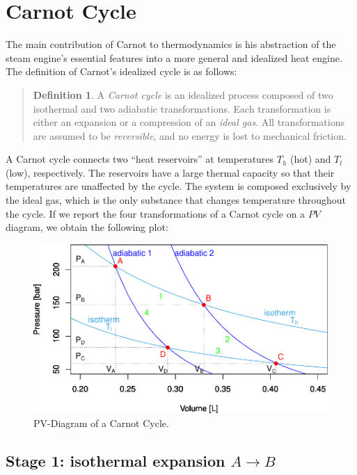 \documentclass[
  9pt,
]{extbook}
\theoremstyle{definition}
\newtheorem{definition}{Definition}[chapter]
\theoremstyle{definition}
\theoremstyle{definition}
\theoremstyle{definition}
\theoremstyle{remark}
\begin{document}
\section{Carnot Cycle}\label{carnotcyclesect}

The main contribution of Carnot to thermodynamics is his abstraction of the steam engine's essential features into a more general and idealized heat engine. The definition of Carnot's idealized cycle is as follows:

\begin{quote}
\begin{definition}
\protect\hypertarget{def:carnotcycle}{}\label{def:carnotcycle}A \emph{Carnot cycle} is an idealized process composed of two isothermal and two adiabatic transformations. Each transformation is either an expansion or a compression of an \emph{ideal gas}. All transformations are assumed to be \emph{reversible}, and no energy is lost to mechanical friction.
\end{definition}
\end{quote}

A Carnot cycle connects two ``heat reservoirs'' at temperatures \(T_h\) (hot) and \(T_l\) (low), respectively. The reservoirs have a large thermal capacity so that their temperatures are unaffected by the cycle. The system is composed exclusively by the ideal gas, which is the only substance that changes temperature throughout the cycle. If we report the four transformations of a Carnot cycle on a \(PV\) diagram, we obtain the following plot:

\begin{figure}

{\centering \includegraphics[width=0.7\linewidth]{pchem1_files/figure-latex/FigCarnotPV-1} 

}

\caption{PV-Diagram of a Carnot Cycle.}\label{fig:FigCarnotPV}
\end{figure}

\subsection{\texorpdfstring{Stage 1: isothermal expansion \(A \rightarrow B\)}{Stage 1: isothermal expansion A \textbackslash rightarrow B}}\label{CCstage1}
\end{document}
